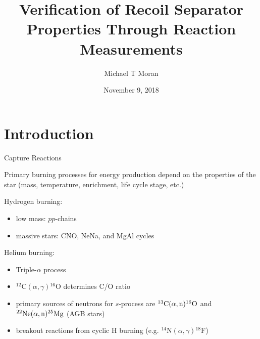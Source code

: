 \documentclass[10pt]{beamer}
\title{
    Verification of Recoil Separator Properties Through Reaction Measurements
}
\subtitle{}
\date{November 9, 2018}
\author{Michael T Moran}
\institute{University of Notre Dame}
\newcommand{\mnuc}[2]{{}^{#1}\textrm{#2}}
\newcommand{\react}[4]{$#1(#2,#3)#4$}
\begin{document}
\maketitle


\section{Introduction}

\begin{frame}[fragile]{Capture Reactions}

    Primary burning processes for energy production depend on the
    properties of the star (mass, temperature, enrichment, life cycle
    stage, etc.)

    Hydrogen burning:
    \begin{itemize}
        \item low mass: $pp$-chains
        \item massive stars: CNO, NeNa, and MgAl cycles
    \end{itemize}

    Helium burning:
    \begin{itemize}
        \item Triple-$\alpha$ process
        \item \react{\mnuc{12}{C}}{\alpha}{\gamma}{\mnuc{16}{O}}
            determines C/O ratio
        \item primary sources of neutrons for $s$-process are
            \react{\mnuc{13}{C}}{\alpha}{\rm n}{\mnuc{16}{O}} and
            \react{\mnuc{22}{Ne}}{\alpha}{\rm n}{\mnuc{25}{Mg}} (AGB
            stars)
        \item breakout reactions from cyclic H burning (e.g.
            \react{\mnuc{14}{N}}{\alpha}{\gamma}{\mnuc{18}{F}})
    \end{itemize}

\end{frame}


\end{document}

